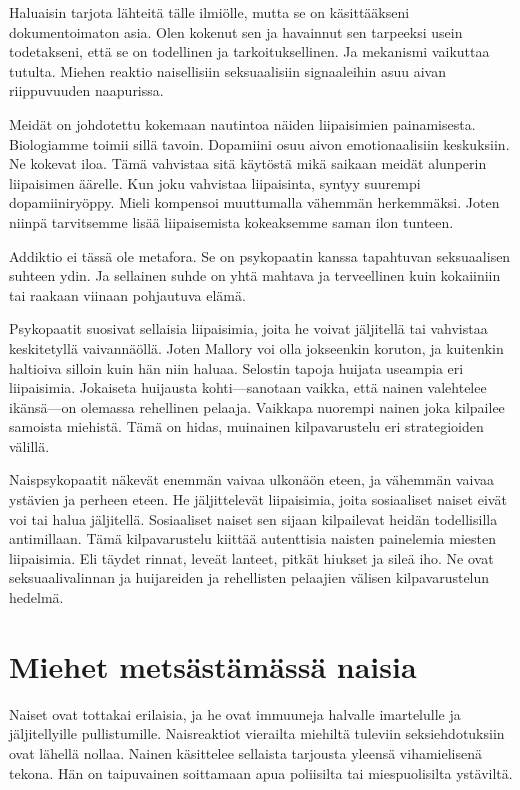 Haluaisin tarjota lähteitä tälle ilmiölle, mutta se on käsittääkseni dokumentoimaton asia. Olen kokenut sen ja havainnut sen tarpeeksi usein todetakseni, että se on todellinen ja tarkoituksellinen. Ja mekanismi vaikuttaa tutulta. Miehen reaktio naisellisiin seksuaalisiin signaaleihin asuu aivan riippuvuuden naapurissa.

Meidät on johdotettu kokemaan nautintoa näiden liipaisimien painamisesta. Biologiamme toimii sillä tavoin. Dopamiini osuu aivon emotionaalisiin keskuksiin. Ne kokevat iloa. Tämä vahvistaa sitä käytöstä mikä saikaan meidät alunperin liipaisimen äärelle. Kun joku vahvistaa liipaisinta, syntyy suurempi dopamiiniryöppy. Mieli kompensoi muuttumalla vähemmän herkemmäksi. Joten niinpä tarvitsemme lisää liipaisemista kokeaksemme saman ilon tunteen.

Addiktio ei tässä ole metafora. Se on psykopaatin kanssa tapahtuvan seksuaalisen suhteen ydin. Ja sellainen suhde on yhtä mahtava ja terveellinen kuin kokaiiniin tai raakaan viinaan pohjautuva elämä.

Psykopaatit suosivat sellaisia liipaisimia, joita he voivat jäljitellä tai vahvistaa keskitetyllä vaivannäöllä. Joten Mallory voi olla jokseenkin koruton, ja kuitenkin haltioiva silloin kuin hän niin haluaa. Selostin tapoja huijata useampia eri liipaisimia. Jokaiseta huijausta kohti---sanotaan vaikka, että nainen valehtelee ikänsä---on olemassa rehellinen pelaaja. Vaikkapa nuorempi nainen joka kilpailee samoista miehistä. Tämä on hidas, muinainen kilpavarustelu eri strategioiden välillä.

Naispsykopaatit näkevät enemmän vaivaa ulkonäön eteen, ja vähemmän vaivaa ystävien ja perheen eteen. He jäljittelevät liipaisimia, joita sosiaaliset naiset eivät voi tai halua jäljitellä. Sosiaaliset naiset sen sijaan kilpailevat heidän todellisilla antimillaan. Tämä kilpavarustelu kiittää autenttisia naisten painelemia miesten liipaisimia. Eli täydet rinnat, leveät lanteet, pitkät hiukset ja sileä iho. Ne ovat seksuaalivalinnan ja huijareiden ja rehellisten pelaajien välisen kilpavarustelun hedelmä.

\section{Miehet metsästämässä naisia}

Naiset ovat tottakai erilaisia, ja he ovat immuuneja halvalle imartelulle ja jäljitellyille pullistumille. Naisreaktiot vierailta miehiltä tuleviin seksiehdotuksiin ovat lähellä nollaa. Nainen käsittelee sellaista tarjousta yleensä vihamielisenä tekona. Hän on taipuvainen soittamaan apua poliisilta tai miespuolisilta ystäviltä.

